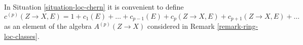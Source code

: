 \begin{remark}
\label{remark-loc-chern-classes}
In Situation \ref{situation-loc-chern} it is convenient to define
$$
c^{(p)}(Z \to X, E) = 1 + c_1(E) + \ldots + c_{p - 1}(E) +
c_p(Z \to X, E) + c_{p + 1}(Z \to X, E) + \ldots
$$
as an element of the algebra $A^{(p)}(Z \to X)$ considered in
Remark \ref{remark-ring-loc-classes}.
\end{remark}